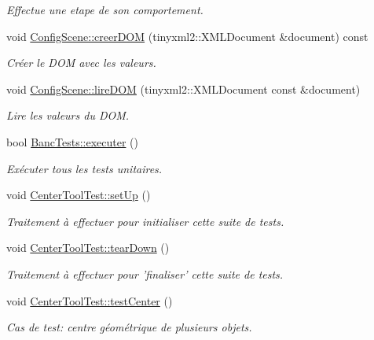 \begin{DoxyCompactItemize}
\begin{DoxyCompactList}\small\item\em Effectue une etape de son comportement. \end{DoxyCompactList}\item 
void \hyperlink{group__inf2990_ga3d0152df0c8c134ecd1a1741302db839}{Config\-Scene\-::creer\-D\-O\-M} (tinyxml2\-::\-X\-M\-L\-Document \&document) const 
\begin{DoxyCompactList}\small\item\em Créer le D\-O\-M avec les valeurs. \end{DoxyCompactList}\item 
void \hyperlink{group__inf2990_gaeacd60be947ce76a1302f6bbb40c90b1}{Config\-Scene\-::lire\-D\-O\-M} (tinyxml2\-::\-X\-M\-L\-Document const \&document)
\begin{DoxyCompactList}\small\item\em Lire les valeurs du D\-O\-M. \end{DoxyCompactList}\item 
bool \hyperlink{group__inf2990_gab5d7fbfe7e3fbe00aa187caa10b1c506}{Banc\-Tests\-::executer} ()
\begin{DoxyCompactList}\small\item\em Exécuter tous les tests unitaires. \end{DoxyCompactList}\item 
void \hyperlink{group__inf2990_gab5443e5a7c8e3ddcd5bac53be6663244}{Center\-Tool\-Test\-::set\-Up} ()
\begin{DoxyCompactList}\small\item\em Traitement à effectuer pour initialiser cette suite de tests. \end{DoxyCompactList}\item 
void \hyperlink{group__inf2990_ga837ac366aa728e8f9536e950b9da3769}{Center\-Tool\-Test\-::tear\-Down} ()
\begin{DoxyCompactList}\small\item\em Traitement à effectuer pour 'finaliser' cette suite de tests. \end{DoxyCompactList}\item 
void \hyperlink{group__inf2990_gab0e6197c88a207aacfd8e9d178a53a47}{Center\-Tool\-Test\-::test\-Center} ()
\begin{DoxyCompactList}\small\item\em Cas de test\-: centre géométrique de plusieurs objets. \end{DoxyCompactList}\item 

\end{DoxyCompactItemize}
